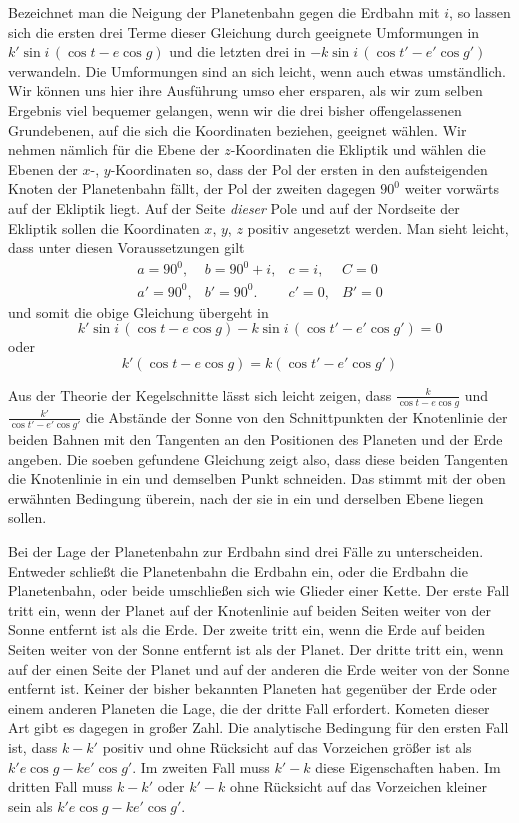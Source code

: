 Bezeichnet man die Neigung der Planetenbahn gegen die Erdbahn mit
$i$, so lassen sich die ersten drei Terme dieser Gleichung durch
geeignete Umformungen in $k'\sin i\,(\cos t-e\cos g)$ und die letzten
drei in $-k\sin i\,(\cos t'-e'\cos g')$ verwandeln.
%
Die Umformungen sind an sich leicht, wenn auch etwas umständlich.
Wir können uns hier ihre Ausführung umso eher ersparen, als wir zum
selben Ergebnis viel bequemer gelangen, wenn wir die drei bisher
offengelassenen Grundebenen, auf die sich die Koordinaten beziehen,
geeignet wählen. Wir nehmen nämlich für die Ebene der $z$-Koordinaten
die Ekliptik und wählen die Ebenen der $x$-, $y$-Koordinaten so, dass
der Pol der ersten in den aufsteigenden Knoten der Planetenbahn fällt,
der Pol der zweiten dagegen $90^0$ weiter vorwärts auf der Ekliptik
liegt. Auf der Seite \textit{dieser} Pole und auf der Nordseite der
Ekliptik sollen die Koordinaten $x$, $y$, $z$ positiv angesetzt werden.
Man sieht leicht, dass unter diesen Voraussetzungen gilt
\[
\begin{array}{llll}
a=90^0,&b=90^0+i,&c=i,&C=0\\
a'=90^0,&b'=90^0.&c'=0,&B'=0
\end{array}
\]
und somit die obige Gleichung übergeht in
\[
k'\sin i\,(\cos t-e\cos g)-k\sin i\,(\cos t'-e'\cos g')=0
\]
oder
\[
k'(\cos t-e\cos g)=k(\cos t'-e'\cos g')
\]

Aus der Theorie der Kegelschnitte lässt sich leicht zeigen, dass
$\frac{k}{\cos t-e\cos g}$ und $\frac{k'}{\cos t'-e'\cos g'}$ die
Abstände der Sonne von den Schnittpunkten der Knotenlinie der beiden
Bahnen mit den Tangenten an den Positionen des Planeten und der Erde
angeben. Die soeben gefundene Gleichung zeigt also, dass diese beiden
Tangenten die Knotenlinie in ein und demselben Punkt schneiden. Das
stimmt mit der oben erwähnten Bedingung überein, nach der sie in ein
und derselben Ebene liegen sollen.

Bei der Lage der Planetenbahn zur Erdbahn sind drei Fälle zu
unterscheiden. Entweder schließt die Planetenbahn die Erdbahn ein,
oder die Erdbahn die Planetenbahn, oder beide umschließen sich wie
Glieder einer Kette. Der erste Fall tritt ein, wenn der Planet auf
der Knotenlinie auf beiden Seiten weiter von der Sonne entfernt ist
als die Erde. Der zweite tritt ein, wenn die Erde auf beiden Seiten
weiter von der Sonne entfernt ist als der Planet. Der dritte tritt
ein, wenn auf der einen Seite der Planet und auf der anderen die
Erde weiter von der Sonne entfernt ist. Keiner der bisher bekannten
Planeten hat gegenüber der Erde oder einem anderen Planeten die Lage,
die der dritte Fall erfordert.
%
Kometen dieser Art gibt es dagegen in großer Zahl. Die analytische
Bedingung für den ersten Fall ist, dass $k-k'$ positiv und ohne
Rücksicht auf das Vorzeichen größer ist als $k'e\cos g-ke'\cos g'$.
Im zweiten Fall muss $k'-k$ diese Eigenschaften haben. Im dritten
Fall muss $k-k'$ oder $k'-k$ ohne Rücksicht auf das Vorzeichen kleiner
sein als $k'e\cos g-ke'\cos g'$.

